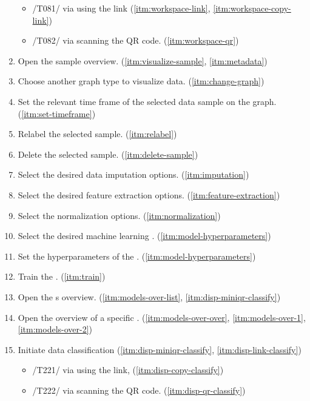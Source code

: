 \begin{enumerate}[{label = \textbf{/T{\protect\twodigits{\arabic{enumi}}}0/}, leftmargin = *}]
\begin{itemize}
        \item /T081/ via using the link (\ref{itm:workspace-link}, \ref{itm:workspace-copy-link})
        \item /T082/ via scanning the \gls{QR code}. (\ref{itm:workspace-qr})
    \end{itemize}
    \item Open the sample overview. (\ref{itm:visualize-sample}, \ref{itm:metadata})
    \item Choose another graph type to visualize data. (\ref{itm:change-graph})
    \item Set the relevant time frame of the selected \gls{data sample} on the graph. (\ref{itm:set-timeframe})
    \item Relabel the selected sample. (\ref{itm:relabel})
    \item Delete the selected sample. (\ref{itm:delete-sample})
    \item Select the desired data imputation options. (\ref{itm:imputation})
    \item Select the desired \gls{feature extraction} options. (\ref{itm:feature-extraction})
    \item Select the normalization options. (\ref{itm:normalization})
    \item Select the desired machine learning . (\ref{itm:model-hyperparameters})
    \item Set the hyperparameters of the . (\ref{itm:model-hyperparameters})
    \item Train the . (\ref{itm:train})
    \item Open the s overview. (\ref{itm:models-over-list}, \ref{itm:disp-miniqr-classify})
    \item Open the overview of a specific . (\ref{itm:models-over-over}, \ref{itm:models-over-1}, \ref{itm:models-over-2})
    \item Initiate data \gls{classification} (\ref{itm:disp-miniqr-classify}, \ref{itm:disp-link-classify})
    \begin{itemize}
        \item /T221/ via using the link, (\ref{itm:disp-copy-classify})
        \item /T222/ via scanning the \gls{QR code}. (\ref{itm:disp-qr-classify})
    \end{itemize} 
\end{enumerate}

